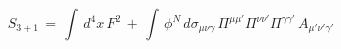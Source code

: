 \begin{equation}
\label{gau3}
S_{3+1} \, = \, \int\, d^4x \, F^2 \, + \, \int \,
\phi^N \, d\sigma_{\mu\nu\gamma} \, \Pi^{\mu\mu'}
\Pi^{\nu\nu'}\Pi^{\gamma\gamma'} \, A_{\mu'\nu'\gamma'}
\end{equation}

